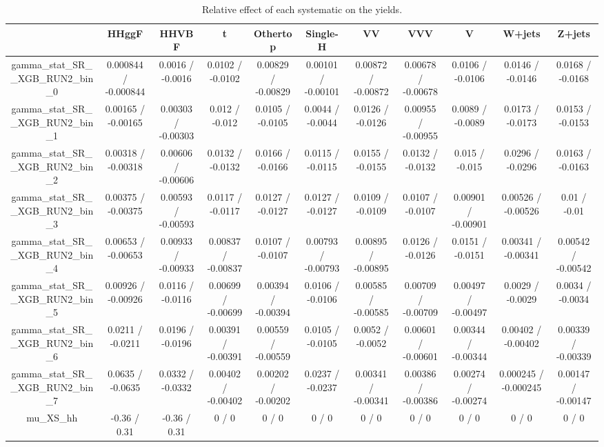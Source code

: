 \documentclass[10pt]{article}
\begin{document}
\begin{table}[htbp]
\begin{center}
\begin{tabular}{|c|c|c|c|c|c|c|c|c|c|c|}
\hline 
      & HHggF      & HHVBF      & t      & Othertop      & Single-H      & VV      & VVV      & V      & W+jets      & Z+jets \\ 
\hline 
  gamma_stat_SR__XGB_RUN2_bin_0 & 0.000844 / -0.000844 & 0.0016 / -0.0016 & 0.0102 / -0.0102 & 0.00829 / -0.00829 & 0.00101 / -0.00101 & 0.00872 / -0.00872 & 0.00678 / -0.00678 & 0.0106 / -0.0106 & 0.0146 / -0.0146 & 0.0168 / -0.0168 \\ 
  gamma_stat_SR__XGB_RUN2_bin_1 & 0.00165 / -0.00165 & 0.00303 / -0.00303 & 0.012 / -0.012 & 0.0105 / -0.0105 & 0.0044 / -0.0044 & 0.0126 / -0.0126 & 0.00955 / -0.00955 & 0.0089 / -0.0089 & 0.0173 / -0.0173 & 0.0153 / -0.0153 \\ 
  gamma_stat_SR__XGB_RUN2_bin_2 & 0.00318 / -0.00318 & 0.00606 / -0.00606 & 0.0132 / -0.0132 & 0.0166 / -0.0166 & 0.0115 / -0.0115 & 0.0155 / -0.0155 & 0.0132 / -0.0132 & 0.015 / -0.015 & 0.0296 / -0.0296 & 0.0163 / -0.0163 \\ 
  gamma_stat_SR__XGB_RUN2_bin_3 & 0.00375 / -0.00375 & 0.00593 / -0.00593 & 0.0117 / -0.0117 & 0.0127 / -0.0127 & 0.0127 / -0.0127 & 0.0109 / -0.0109 & 0.0107 / -0.0107 & 0.00901 / -0.00901 & 0.00526 / -0.00526 & 0.01 / -0.01 \\ 
  gamma_stat_SR__XGB_RUN2_bin_4 & 0.00653 / -0.00653 & 0.00933 / -0.00933 & 0.00837 / -0.00837 & 0.0107 / -0.0107 & 0.00793 / -0.00793 & 0.00895 / -0.00895 & 0.0126 / -0.0126 & 0.0151 / -0.0151 & 0.00341 / -0.00341 & 0.00542 / -0.00542 \\ 
  gamma_stat_SR__XGB_RUN2_bin_5 & 0.00926 / -0.00926 & 0.0116 / -0.0116 & 0.00699 / -0.00699 & 0.00394 / -0.00394 & 0.0106 / -0.0106 & 0.00585 / -0.00585 & 0.00709 / -0.00709 & 0.00497 / -0.00497 & 0.0029 / -0.0029 & 0.0034 / -0.0034 \\ 
  gamma_stat_SR__XGB_RUN2_bin_6 & 0.0211 / -0.0211 & 0.0196 / -0.0196 & 0.00391 / -0.00391 & 0.00559 / -0.00559 & 0.0105 / -0.0105 & 0.0052 / -0.0052 & 0.00601 / -0.00601 & 0.00344 / -0.00344 & 0.00402 / -0.00402 & 0.00339 / -0.00339 \\ 
  gamma_stat_SR__XGB_RUN2_bin_7 & 0.0635 / -0.0635 & 0.0332 / -0.0332 & 0.00402 / -0.00402 & 0.00202 / -0.00202 & 0.0237 / -0.0237 & 0.00341 / -0.00341 & 0.00386 / -0.00386 & 0.00274 / -0.00274 & 0.000245 / -0.000245 & 0.00147 / -0.00147 \\ 
  mu_XS_hh & -0.36 / 0.31 & -0.36 / 0.31 & 0 / 0 & 0 / 0 & 0 / 0 & 0 / 0 & 0 / 0 & 0 / 0 & 0 / 0 & 0 / 0 \\ 
\hline 
\end{tabular} 
\caption{Relative effect of each systematic on the yields.} 
\end{center} 
\end{table} 
\end{document}
